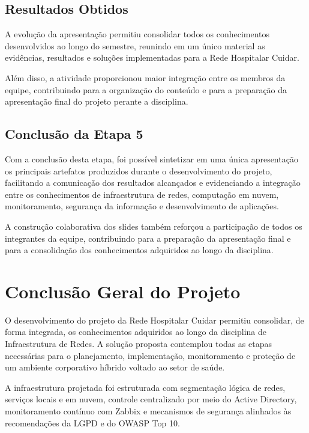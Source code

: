 \documentclass[12pt,a4paper,oneside]{report}
\begin{document}
\section{Resultados Obtidos}

A evolução da apresentação permitiu consolidar todos os conhecimentos desenvolvidos ao longo do semestre, reunindo em um único material as evidências, resultados e soluções implementadas para a Rede Hospitalar Cuidar.

Além disso, a atividade proporcionou maior integração entre os membros da equipe, contribuindo para a organização do conteúdo e para a preparação da apresentação final do projeto perante a disciplina.

\section{Conclusão da Etapa 5}

Com a conclusão desta etapa, foi possível sintetizar em uma única apresentação os principais artefatos produzidos durante o desenvolvimento do projeto, facilitando a comunicação dos resultados alcançados e evidenciando a integração entre os conhecimentos de infraestrutura de redes, computação em nuvem, monitoramento, segurança da informação e desenvolvimento de aplicações.

A construção colaborativa dos slides também reforçou a participação de todos os integrantes da equipe, contribuindo para a preparação da apresentação final e para a consolidação dos conhecimentos adquiridos ao longo da disciplina.



\chapter*{Conclusão Geral do Projeto}

O desenvolvimento do projeto da Rede Hospitalar Cuidar permitiu consolidar, de forma integrada, os conhecimentos adquiridos ao longo da disciplina de Infraestrutura de Redes. A solução proposta contemplou todas as etapas necessárias para o planejamento, implementação, monitoramento e proteção de um ambiente corporativo híbrido voltado ao setor de saúde.

A infraestrutura projetada foi estruturada com segmentação lógica de redes, serviços locais e em nuvem, controle centralizado por meio do Active Directory, monitoramento contínuo com Zabbix e mecanismos de segurança alinhados às recomendações da LGPD e do OWASP Top 10.
\end{document}
